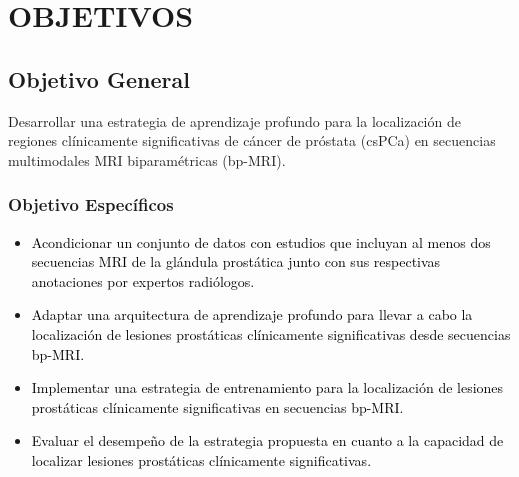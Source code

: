     \chapter{OBJETIVOS}

\section*{Objetivo General}

\begin{itemize}
Desarrollar una estrategia de aprendizaje profundo para la localización de regiones clínicamente significativas de cáncer de próstata (csPCa) en secuencias multimodales MRI biparamétricas (bp-MRI).
\end{itemize}


\subsection*{Objetivo Específicos}
\begin{itemize}
\item \textcolor{black}{Acondicionar un conjunto de datos con estudios que incluyan al menos dos secuencias MRI de la glándula prostática junto con sus respectivas anotaciones por expertos radiólogos.}
\item \textcolor{black}{Adaptar una arquitectura de aprendizaje profundo para llevar a cabo la localización de lesiones prostáticas clínicamente significativas desde secuencias bp-MRI.}
\item \textcolor{black}{Implementar una estrategia de entrenamiento para la localización de lesiones prostáticas clínicamente significativas en secuencias bp-MRI.}
\item \textcolor{black}{Evaluar el desempeño de la estrategia propuesta en cuanto a la capacidad de localizar lesiones prostáticas clínicamente significativas.}
\end{itemize}
